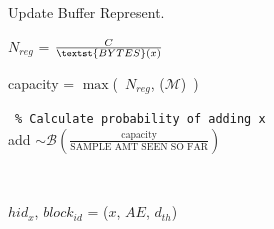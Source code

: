 \documentclass[colorinlistoftodos]{article} %
\begin{document}
\begin{minipage}{\textwidth}
\begin{minipage}{0.45\textwidth}
\begin{algorithm2e}[H]\small
\SetAlgoLined
  \DontPrintSemicolon
    

 \caption{Update Buffer Represent.}
\label{algo:vqr}
    
\end{algorithm2e}
\end{minipage}
\qquad
\begin{minipage}{0.5\textwidth}
\begin{algorithm2e}[H]\small
\SetAlgoLined
  \DontPrintSemicolon
    
    $N_{reg}$ = $\frac{C}{\textst{BYTES}(x)}$
    
    
    capacity = $\max$(\ $N_{reg}$, ($\mathcal{M}$)\ ) 
    
     \,\,\,\texttt{\% Calculate probability of adding x} \\
    add $\sim \mathcal{B}(\frac{\text{capacity}}{\text{SAMPLE AMT SEEN SO FAR}})$
    
    \,\,
    {
        $hid_x$, $block_{id}$ = ($x$, $AE$, $d_{th}$) \\
        
}
\end{algorithm2e}
\end{minipage}
\end{minipage}
\end{document}
